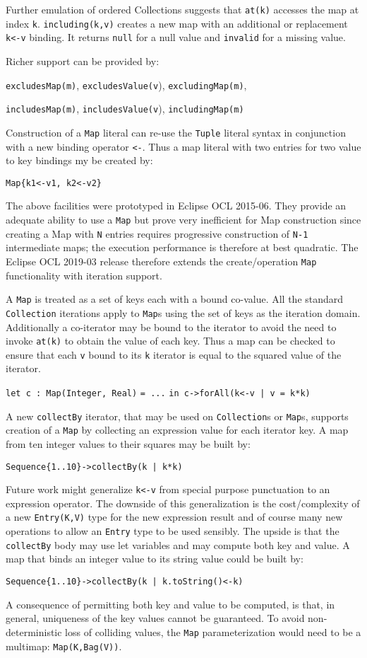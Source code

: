 \documentclass{llncs}
\begin{document}
Further emulation of ordered Collections suggests that \verb$at(k)$ accesses the map at index \verb$k$. \verb$including(k,v)$ creates a new map with an additional or replacement \verb$k<-v$ binding. It returns \verb$null$ for a null value and \verb$invalid$ for a missing value.

Richer support can be provided by:

\verb$excludesMap(m)$, \verb$excludesValue(v$), \verb$excludingMap(m)$,

\verb$includesMap(m)$, \verb$includesValue(v$), \verb$includingMap(m)$

Construction of a \verb$Map$ literal can re-use the \verb$Tuple$ literal syntax in conjunction with a new binding operator \verb$<-$. Thus a map literal with two entries for two value to key bindings my be created by:

\verb$Map{k1<-v1, k2<-v2}$

The above facilities were prototyped in Eclipse OCL 2015-06. They provide an adequate ability to use a \verb$Map$ but prove very inefficient for Map construction since creating a Map with \verb$N$ entries requires progressive construction of \verb$N-1$ intermediate maps; the execution performance is therefore at best quadratic. The Eclipse OCL 2019-03 release therefore extends the create/operation \verb$Map$ functionality with iteration support.

A \verb$Map$ is treated as a set of keys each with a bound co-value. All the standard \verb$Collection$ iterations apply to \verb$Map$s using the set of keys as the iteration domain. Additionally a co-iterator may be bound to the iterator to avoid the need to invoke \verb$at(k)$ to obtain the value of each key. Thus a map can be checked to ensure that each \verb$v$ bound to its \verb$k$ iterator is equal to the squared value of the iterator.

\verb$let c : Map(Integer, Real)$ \verb$= ...$ \verb$in c->forAll(k<-v | v = k*k)$

A new \verb$collectBy$ iterator, that may be used on \verb$Collection$s or \verb$Map$s, supports creation of a \verb$Map$ by collecting an expression value for each iterator key. A map from ten integer values to their squares may be built by:

\verb$Sequence{1..10}->collectBy(k | k*k)$

Future work might generalize \verb$k<-v$ from special purpose punctuation to an expression operator. The downside of this generalization is the cost/complexity of a new \verb$Entry(K,V)$ type for the new expression result and of course many new operations to allow an \verb$Entry$ type to be used sensibly. The upside is that the \verb$collectBy$ body may use let variables and may compute both key and value. A map that binds an integer value  to its string value could be built by: 

\verb$Sequence{1..10}->collectBy(k | k.toString()<-k)$ 

A consequence of permitting both key and value to be computed, is that, in general, uniqueness of the key values cannot be guaranteed. To avoid non-deterministic loss of colliding values, the \verb$Map$ parameterization would need to be a multimap: \verb$Map(K,Bag(V))$. 
\end{document}
